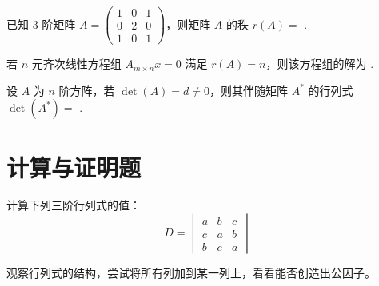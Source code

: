 \documentclass[a4paper, 12pt]{ctexart}
\begin{document}
\begin{exercise}
    已知 3 阶矩阵 $A = \begin{pmatrix} 1 & 0 & 1 \\ 0 & 2 & 0 \\ 1 & 0 & 1 \end{pmatrix}$，则矩阵 $A$ 的秩 $r(A) = $ \underline{\hspace{2cm}}.
\end{exercise}

\vspace{0.5cm}

\begin{exercise}
    若 $n$ 元齐次线性方程组 $A_{m \times n}x=0$ 满足 $r(A)=n$，则该方程组的解为 \underline{\hspace{3cm}}.
\end{exercise}

\vspace{0.5cm}

\begin{exercise}
    设 $A$ 为 $n$ 阶方阵，若 $\det(A) = d \neq 0$，则其伴随矩阵 $A^*$ 的行列式 $\det(A^*) = $ \underline{\hspace{2cm}}.
\end{exercise}

\vspace{1cm}

\section{计算与证明题}

\begin{exampleexercise}[作答范例]
    计算下列三阶行列式的值：
    $$
    D = \begin{vmatrix}
    a & b & c \\
    c & a & b \\
    b & c & a
    \end{vmatrix}
    $$
\end{exampleexercise}

\begin{hint}
    观察行列式的结构，尝试将所有列加到某一列上，看看能否创造出公因子。
\end{hint}
\end{document}
